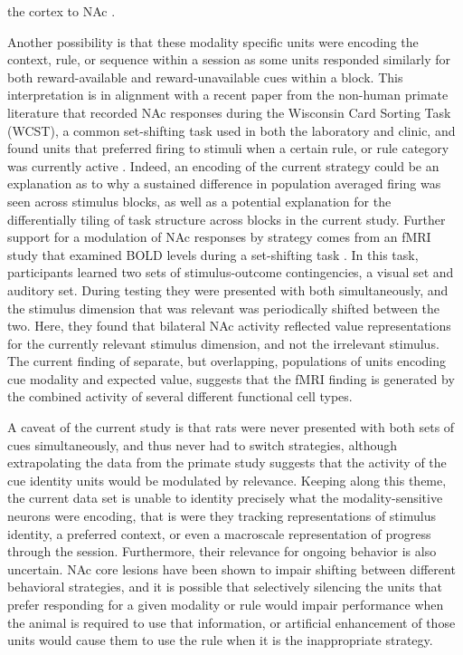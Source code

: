 \documentclass[11pt]{article}
\let\cite=\citep
\begin{document}
{the cortex to NAc \cite{Cooch2015,Ishikawa2008}. 

Another possibility is that these modality specific units were encoding the context, rule, or sequence within a session as some units responded similarly for both reward-available and reward-unavailable cues within a block. This interpretation is in alignment with a recent paper from the non-human primate literature that recorded NAc responses during the Wisconsin Card Sorting Task (WCST), a common set-shifting task used in both the laboratory and clinic, and found units that preferred firing to stimuli when a certain rule, or rule category was currently active \cite{Sleezer2016}. Indeed, an encoding of the current strategy could be an explanation as to why a sustained difference in population averaged firing was seen across stimulus blocks, as well as a potential explanation for the differentially tiling of task structure across blocks in the current study. Further support for a modulation of NAc responses by strategy comes from an fMRI study that examined BOLD levels during a set-shifting task \cite{Fitzgerald2014}. In this task, participants learned two sets of stimulus-outcome contingencies, a visual set and auditory set. During testing they were presented with both simultaneously, and the stimulus dimension that was relevant was periodically shifted between the two. Here, they found that bilateral NAc activity reflected value representations for the currently relevant stimulus dimension, and not the irrelevant stimulus. The current finding of separate, but overlapping, populations of units encoding cue modality and expected value, suggests that the fMRI finding is generated by the combined activity of several different functional cell types.

A caveat of the current study is that rats were never presented with both sets of cues simultaneously, and thus never had to switch strategies, although extrapolating the data from the primate study suggests that the activity of the cue identity units would be modulated by relevance. Keeping along this theme, the current data set is unable to identity precisely what the modality-sensitive neurons were encoding, that is were they tracking representations of stimulus identity, a preferred context, or even a macroscale representation of progress through the session. Furthermore, their relevance for ongoing behavior is also uncertain. NAc core lesions have been shown to impair shifting between different behavioral strategies, and it is possible that selectively silencing the units that prefer responding for a given modality or rule would impair performance when the animal is required to use that information, or artificial enhancement of those units would cause them to use the rule when it is the inappropriate strategy.

}
\end{document}
